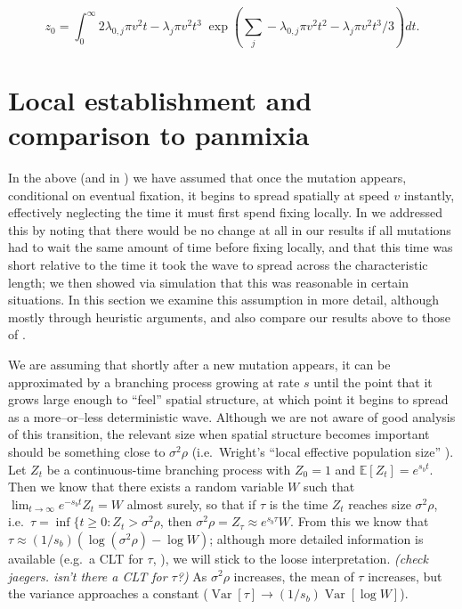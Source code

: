 \documentclass{article}
\newcommand{\var}{\mathop{\mbox{Var}}}
\newcommand{\E}{\mathbb{E}}
\newcommand{\marginnote}[1]{{\it\color{red}(#1)}}
\begin{document}
\begin{equation}
    z_0 = \int_0^\infty {2 \lambda_{0,j} \pi v^2 t - \lambda_j \pi v^2 t^3 } \; \exp \left(\sum_j - \lambda_{0,j} \pi v^2 t^2 - \lambda_j \pi v^2 t^3 / 3 \right) dt .
\end{equation}


\section{Local establishment and comparison to panmixia}

In the above (and in \citet{ralphcoop2010}) we have assumed that once the mutation appears,
conditional on eventual fixation, it begins to spread spatially at speed $v$ instantly,
effectively neglecting the time it must first spend fixing locally.
In \citet{ralphcoop2010} we addressed this by noting that there would be no change at all in our results 
if all mutations had to wait the same amount of time before fixing locally,
and that this time was short relative to the time it took the wave to spread across the characteristic length;
we then showed via simulation that this was reasonable in certain situations.
In this section we examine this assumption in more detail, although mostly through heuristic arguments,
and also compare our results above to those of \citet{softsweeps}.

We are assuming that shortly after a new mutation appears, 
it can be approximated by a branching process growing at rate $s$
until the point that it grows large enough to ``feel'' spatial structure,
at which point it begins to spread as a more--or--less deterministic wave.
Although we are not aware of good analysis of this transition, 
the relevant size when spatial structure becomes important
should be something close to $\sigma^2 \rho$ 
(i.e.\ Wright's ``local effective population size'' \citep{XXX}).
Let $Z_t$ be a continuous-time branching process with $Z_0=1$ and $\E[Z_t] = e^{s_b t}$.
Then we know that there exists a random variable $W$ such that $\lim_{t\to\infty} e^{-s_b t} Z_t = W$ almost surely,
so that if $\tau$ is the time $Z_t$ reaches size $\sigma^2 \rho$, i.e.\ $\tau = \inf\{ t \ge 0: Z_t > \sigma^2 \rho$,
then $\sigma^2 \rho = Z_\tau \approx e^{s_b \tau} W$.
From this we know that $\tau \approx (1/s_b) (\log (\sigma^2 \rho) - \log W)$;
although more detailed information is available (e.g.\ a CLT for $\tau$, \citet{XXX}),
we will stick to the loose interpretation.
\marginnote{check jaegers.  isn't there a CLT for $\tau$?}
As $\sigma^2 \rho$ increases, the mean of $\tau$ increases, but the variance approaches a constant
($\var[\tau] \to (1/s_b) \var[\log W]$).
\end{document}

